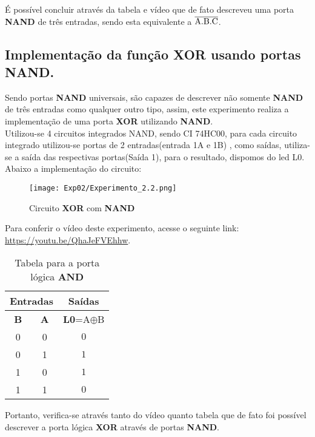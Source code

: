 \documentclass[12pt]{article}
\begin{document}
É possível concluir através da tabela e vídeo que de fato descreveu uma porta \textbf{NAND} de três entradas, sendo esta equivalente a $\overline{\rm A.B.C}$.
\\[2em]

\subsection{Implementação da função \textbf{XOR} usando portas \textbf{NAND}.}\label{sec:and_e_or}

Sendo portas \textbf{NAND} universais, são capazes de descrever não somente \textbf{NAND} de três entradas como qualquer outro tipo, assim, este experimento realiza a implementação de uma porta \textbf{XOR} utilizando \textbf{NAND}.\\
Utilizou-se 4 circuitos integrados NAND, sendo CI 74HC00, para cada circuito integrado utilizou-se portas de 2 entradas(entrada 1A e 1B) , como saídas, utiliza-se a saída das respectivas portas(Saída 1), para o resultado, dispomos do led L0.\\

Abaixo a implementação do circuito:
\begin{figure}[H]
    \centering
    \texttt{[image: Exp02/Experimento\_2.2.png]}
    \caption{Circuito \textbf{XOR} com \textbf{NAND}}\label{fig:Esquema_Experimento2_2.2}
\end{figure}
Para conferir o vídeo deste experimento, acesse o seguinte link:
\href{https://youtu.be/QhaJeFVEhhw}{https://youtu.be/QhaJeFVEhhw}.

\begin{table}[H]
    \centering
    \caption{Tabela para a porta lógica \textbf{AND}}
    \begin{tabular}{|c|c|c|}
    \hline
        \multicolumn{2}{|c|}{Entradas} & \multicolumn{1}{c|}{Saídas}\\
    \hline
    \textbf{B} & \textbf{A} & \textbf{L0}=A$\oplus$B \\
    \hline
    0  & 0 & \(0\) \\
    \hline
    0  & 1 & \(1\) \\
    \hline
    1  & 0 & \(1\) \\
    \hline
    1  & 1 & \(0\) \\
    \hline
    \end{tabular}\label{tab:tabela_and}
\end{table}

Portanto, verifica-se através tanto do vídeo quanto tabela que de fato foi possível descrever a porta lógica \textbf{XOR} através de portas \textbf{NAND}.\\[2em]
\end{document}
